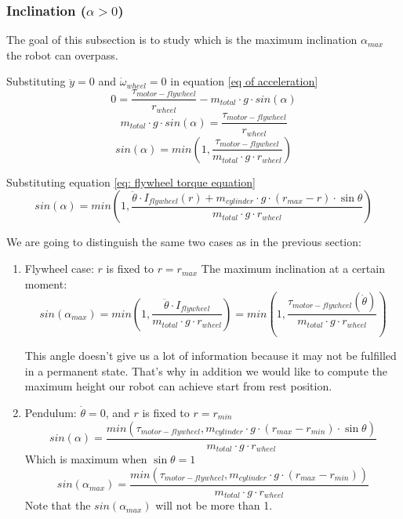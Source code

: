 \subsubsection{Inclination ($\alpha > 0$)}
The goal of this subsection is to study which is the maximum inclination $\alpha_{max}$ the robot can overpass.

Substituting $\ddot{y}=0$ and $\dot{\omega}_{wheel} = 0$ in equation \ref{eq of acceleration}
\[0 = \frac{\tau_{motor-flywheel}}{r_{wheel}} - m_{total} \cdot  g \cdot  sin(\alpha)\]
\[m_{total} \cdot  g \cdot  sin(\alpha) = \frac{\tau_{motor-flywheel}}{r_{wheel}} \]
\[sin(\alpha) = min(1,\frac{\tau_{motor-flywheel}}{m_{total} \cdot  g \cdot  r_{wheel}}) \]

Substituting equation \ref{eq: flywheel torque equation}
\[sin(\alpha) = min(1,\frac{\ddot{\theta}\cdot I_{flywheel}(r) + m_{cylinder} \cdot  g \cdot  (r_{max} - r) \cdot  \sin{\theta}}{m_{total} \cdot  g \cdot  r_{wheel}}) \]


We are going to distinguish the same two cases as in the previous section:
\begin{enumerate}
    \item Flywheel case: $r$ is fixed to $r = r_{max}$
    The maximum inclination at a certain moment:
    \begin{equation}\label{Maximum angle using flywheel system}
        \boxed{sin(\alpha_{max}) = min(1,\frac{\ddot{\theta}\cdot I_{flywheel}}{m_{total} \cdot  g \cdot  r_{wheel}}) = min(1,\frac{\tau_{motor-flywheel}(\dot{\theta})}{m_{total} \cdot  g \cdot  r_{wheel}})}
    \end{equation}


    This angle doesn't give us a lot of information because it may not be fulfilled in a 
    permanent state. That's why in addition we would like to compute the maximum height
    our robot can achieve start from rest position.
    \item Pendulum: $\dot{\theta} = 0$, and $r$ is fixed to $r = r_{min}$
    \[sin(\alpha) = \frac{min(\tau_{motor-flywheel},m_{cylinder} \cdot  g \cdot  (r_{max} - r_{min}) \cdot  \sin{\theta})}{m_{total} \cdot  g \cdot  r_{wheel}} \]
    Which is maximum when $\sin{\theta} = 1$
    \begin{equation}\label{Maximum angle using pendulum system}
        \boxed{sin(\alpha_{max}) = \frac{min(\tau_{motor-flywheel},m_{cylinder} \cdot  g \cdot  (r_{max} - r_{min}))}{m_{total} \cdot  g \cdot  r_{wheel}}}
    \end{equation}
    Note that the $sin(\alpha_{max})$ will not be more than 1.
\end{enumerate}

